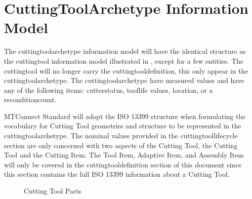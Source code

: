 \documentclass{mtconnect}	%
\begin{document}
\section{CuttingToolArchetype Information Model}
The \gls{cuttingtoolarchetype} \gls{information model} will have the identical structure as the \gls{cuttingtool} \gls{information model} illustrated in , except for a few entities.  The \gls{cuttingtool} will no longer carry the \gls{cuttingtooldefinition}, this \MUST only appear in the \gls{cuttingtoolarchetype}.  The \gls{cuttingtoolarchetype} \MUSTNOT have measured values and \MUSTNOT have any of the following items: \gls{cutterstatus}, \gls{toollife} values, \gls{location}, or a \gls{reconditioncount}. 

MTConnect Standard will adopt the ISO 13399 structure when formulating the vocabulary for Cutting Tool geometries and structure to be represented in the \gls{cuttingtoolarchetype}.  The nominal values provided in the \gls{cuttingtoollifecycle} section are only concerned with two aspects of the Cutting Tool, the Cutting Tool and the Cutting Item.  The Tool Item, Adaptive Item, and Assembly Item will only be covered in the \gls{cuttingtooldefinition} section of this document since this section contains the full ISO 13399 information about a Cutting Tool.

\begin{figure}[ht]
  \centering
  \caption{Cutting Tool Parts}
  \label{fig:cutting-tool-parts}
\end{figure}

\FloatBarrier
\end{document}
